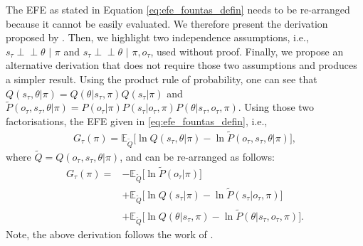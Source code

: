 \documentclass[twoside,11pt]{article}
\newcommand{\indep}{\perp \! \! \! \perp}
\begin{document}
The EFE as stated in Equation \eqref{eq:efe_fountas_defin} needs to be re-arranged because it cannot be easily evaluated. We therefore present the derivation proposed by \citet{DeepAIwithMCMC}. Then, we highlight two independence assumptions, i.e., $s_\tau \indep \theta \,\,|\,\, \pi$ and $s_\tau \indep \theta \,\,| \,\,\pi, o_\tau$, used without proof. Finally, we propose an alternative derivation that does not require those two assumptions and produces a simpler result. Using the product rule of probability, one can see that $Q(s_\tau, \theta|\pi) = Q(\theta|s_\tau,\pi)Q(s_\tau|\pi)$ and $\tilde{P}(o_\tau,s_\tau,\theta|\pi) = P(o_\tau|\pi)P(s_\tau|o_\tau,\pi)P(\theta|s_\tau,o_\tau,\pi)$. Using those two factorisations, the EFE given in \eqref{eq:efe_fountas_defin}, i.e.,
\begin{align*}
G_{\tau}(\pi) = \mathbb{E}_{\tilde{Q}}\Big[ \ln Q(s_\tau, \theta|\pi) - \ln \tilde{P}(o_\tau, s_\tau,\theta|\pi) \Big],
\end{align*}
where $\tilde{Q} = Q(o_\tau, s_\tau, \theta|\pi)$, and can be re-arranged as follows:
\begin{align}
G_{\tau}(\pi) = &- \mathbb{E}_{\tilde{Q}}\Big[ \ln \tilde{P}(o_\tau|\pi)\Big]\nonumber\\
&+ \mathbb{E}_{\tilde{Q}}\Big[ \ln Q(s_\tau|\pi) - \ln \tilde{P}(s_\tau|o_\tau, \pi) \Big]\nonumber\\
&+ \mathbb{E}_{\tilde{Q}}\Big[ \ln Q(\theta|s_\tau, \pi) - \ln \tilde{P}(\theta|s_\tau,o_\tau,\pi) \Big].\label{eq:efe_rearrangedd}
\end{align}
Note, the above derivation follows the work of \citet{DeepAIwithMCMC}.
\end{document}
